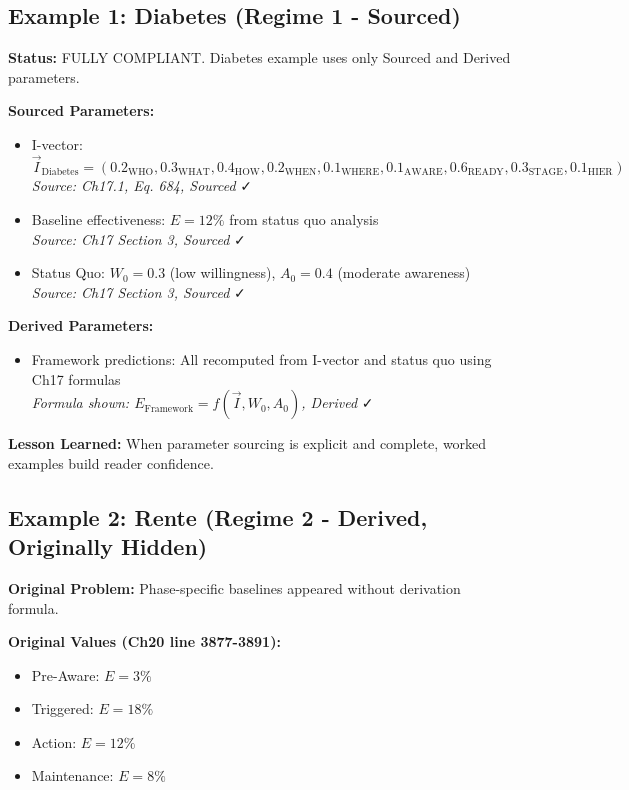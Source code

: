 \subsection{Example 1: Diabetes (Regime 1 - Sourced)}
\label{subsec:jjj-diabetes}

\textbf{Status:} FULLY COMPLIANT. Diabetes example uses only Sourced and Derived parameters.

\textbf{Sourced Parameters:}
\begin{itemize}[nosep]
\item I-vector: $\vec{I}_{\text{Diabetes}} = (0.2_{\text{WHO}}, 0.3_{\text{WHAT}}, 0.4_{\text{HOW}}, 0.2_{\text{WHEN}}, 0.1_{\text{WHERE}}, 0.1_{\text{AWARE}}, 0.6_{\text{READY}}, 0.3_{\text{STAGE}}, 0.1_{\text{HIER}})$
\\ \textit{Source: Ch17.1, Eq. 684, Sourced} ✓
\item Baseline effectiveness: $E = 12\%$ from status quo analysis
\\ \textit{Source: Ch17 Section 3, Sourced} ✓
\item Status Quo: $W_0 = 0.3$ (low willingness), $A_0 = 0.4$ (moderate awareness)
\\ \textit{Source: Ch17 Section 3, Sourced} ✓
\end{itemize}

\textbf{Derived Parameters:}
\begin{itemize}[nosep]
\item Framework predictions: All recomputed from I-vector and status quo using Ch17 formulas
\\ \textit{Formula shown: $E_{\text{Framework}} = f(\vec{I}, W_0, A_0)$, Derived} ✓
\end{itemize}

\textbf{Lesson Learned:} When parameter sourcing is explicit and complete, worked examples build reader confidence.

\subsection{Example 2: Rente (Regime 2 - Derived, Originally Hidden)}
\label{subsec:jjj-rente}

\textbf{Original Problem:} Phase-specific baselines appeared without derivation formula.

\textbf{Original Values (Ch20 line 3877-3891):}
\begin{itemize}[nosep]
\item Pre-Aware: $E = 3\%$
\item Triggered: $E = 18\%$
\item Action: $E = 12\%$
\item Maintenance: $E = 8\%$
\end{itemize}

